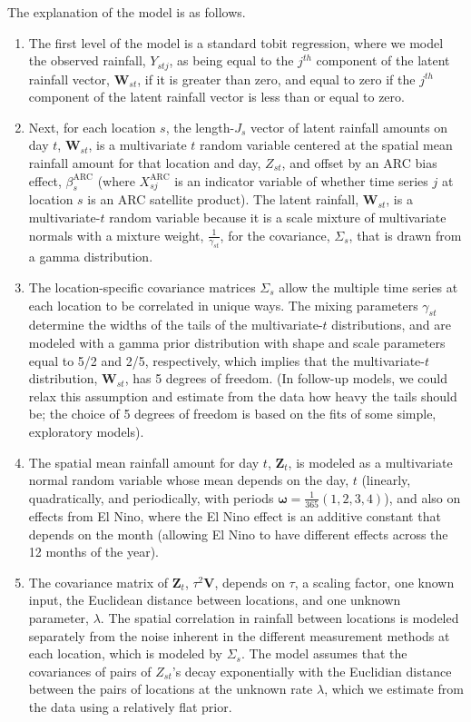 \documentclass[12pt]{article}
\def\bomega{\pmb{\omega}}
\def\bZ{\pmb{Z}}
\def\bV{\pmb{V}}
\def\bW{\pmb{W}}
\begin{document}
\newpage

The explanation of the model is as follows.
\begin{enumerate}
\item The first level of the model is a standard tobit regression, where we model the observed rainfall, $Y_{stj}$, as being equal to the $j^{th}$ component of the latent rainfall vector, $\bW_{st}$, if it is greater than zero, and equal to zero if the $j^{th}$ component of the latent rainfall vector is less than or equal to zero.
\item Next, for each location $s$, the length-$J_s$ vector of latent rainfall amounts on day $t$, $\bW_{st}$, is a multivariate $t$ random variable centered at the spatial mean rainfall amount for that location and day, $Z_{st}$, and offset by an ARC bias effect, $\beta_s^\text{ARC}$ (where $X^\text{ARC}_{sj}$ is an indicator variable of whether time series $j$ at location $s$ is an ARC satellite product). The latent rainfall, $\bW_{st}$, is a multivariate-$t$ random variable because it is a scale mixture of multivariate normals with a mixture weight, $\frac{1}{\gamma_{st}}$, for the covariance, $\Sigma_s$, that is drawn from a gamma distribution.
\item The location-specific covariance matrices $\Sigma_s$ allow the multiple time series at each location to be correlated in unique ways. The mixing parameters $\gamma_{st}$ determine the widths of the tails of the multivariate-$t$ distributions, and are modeled with a gamma prior distribution with shape and scale parameters equal to 5/2 and 2/5, respectively, which implies that the multivariate-$t$ distribution, $\bW_{st}$, has 5 degrees of freedom. (In follow-up models, we could relax this assumption and estimate from the data how heavy the tails should be; the choice of 5 degrees of freedom is based on the fits of some simple, exploratory models).
\item The spatial mean rainfall amount for day $t$, $\bZ_t$, is modeled as a multivariate normal random variable whose mean depends on the day, $t$ (linearly, quadratically, and periodically, with periods $\bomega = \frac{1}{365}(1, 2, 3, 4)$), and also on effects from El Nino, where the El Nino effect is an additive constant that depends on the month (allowing El Nino to have different effects across the 12 months of the year).
\item The covariance matrix of $\bZ_t$, $\tau^2\bV$, depends on $\tau$, a scaling factor, one known input, the Euclidean distance between locations, and one unknown parameter, $\lambda$. The spatial correlation in rainfall between locations is modeled separately from the noise inherent in the different measurement methods at each location, which is modeled by $\Sigma_s$. The model assumes that the covariances of pairs of $Z_{st}$'s decay exponentially with the Euclidian distance between the pairs of locations at the unknown rate $\lambda$, which we estimate from the data using a relatively flat prior.

\end{enumerate}
\end{document}
